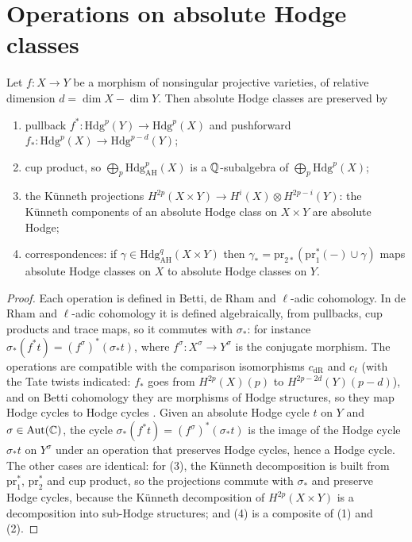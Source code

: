 \section{Operations on absolute Hodge classes}\label{absolute-hodge:section-operations}

\begin{proposition}\label{absolute-hodge:proposition-operations}
Let $f \colon X \to Y$ be a morphism of nonsingular projective varieties, of relative dimension $d = \dim X - \dim Y$. Then absolute Hodge classes are preserved by
\begin{enumerate}
\item pullback $f^* \colon \mathrm{Hdg}^p(Y) \to \mathrm{Hdg}^p(X)$ and pushforward $f_* \colon \mathrm{Hdg}^p(X) \to \mathrm{Hdg}^{p-d}(Y)$;
\item cup product, so $\bigoplus_p\mathrm{Hdg}^p_{\mathrm{AH}}(X)$ is a $\mathbb{Q}$-subalgebra of $\bigoplus_p\mathrm{Hdg}^p(X)$;
\item the K\"unneth projections $H^{2p}(X \times Y) \to H^i(X) \otimes H^{2p-i}(Y)$: the K\"unneth components of an absolute Hodge class on $X \times Y$ are absolute Hodge;
\item correspondences: if $\gamma \in \mathrm{Hdg}^q_{\mathrm{AH}}(X \times Y)$ then $\gamma_* = \mathrm{pr}_{2*}(\mathrm{pr}_1^*(-) \cup \gamma)$ maps absolute Hodge classes on $X$ to absolute Hodge classes on $Y$.
\end{enumerate}
\end{proposition}

\begin{proof}
Each operation is defined in Betti, de Rham and $\ell$-adic cohomology. In de Rham and $\ell$-adic cohomology it is defined algebraically, from pullbacks, cup products and trace maps, so it commutes with
$\sigma_*$: for instance $\sigma_*(f^*t) = (f^\sigma)^*(\sigma_*t)$, where $f^\sigma \colon X^\sigma \to Y^\sigma$ is the conjugate morphism. The operations are compatible with the comparison isomorphisms
$c_{\mathrm{dR}}$ and $c_\ell$ (with the Tate twists indicated: $f_*$ goes from $H^{2p}(X)(p)$ to $H^{2p-2d}(Y)(p - d)$), and on Betti cohomology they are morphisms of Hodge structures, so they map Hodge cycles to Hodge
cycles \cite{deligne-abelian}. Given an absolute Hodge cycle $t$ on $Y$ and $\sigma \in \mathrm{Aut}(\mathbb{C})$, the cycle $\sigma_*(f^*t) = (f^\sigma)^*(\sigma_*t)$ is the image of the Hodge cycle $\sigma_*t$ on $Y^\sigma$
under an operation that preserves Hodge cycles, hence a Hodge cycle. The other cases are identical: for (3), the K\"unneth decomposition is built from $\mathrm{pr}_1^*$, $\mathrm{pr}_2^*$ and cup product, so the
projections commute with $\sigma_*$ and preserve Hodge cycles, because the K\"unneth decomposition of $H^{2p}(X \times Y)$ is a decomposition into sub-Hodge structures; and (4) is a composite of (1) and (2).
\end{proof}

